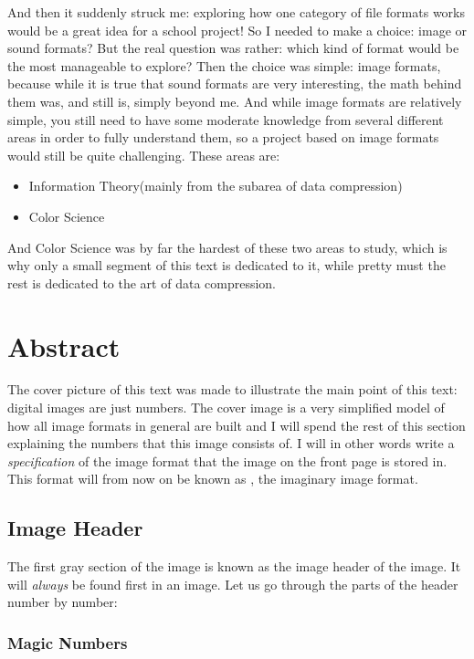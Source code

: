 And then it suddenly struck me: exploring how one category of file
formats works would be a great idea for a school project! So I needed to
make a choice: image or sound formats? But the real question was
rather: which kind of format would be the most manageable to explore?
Then the choice was simple: image formats, because while it is true
that sound formats are very interesting, the math behind them was, and
still is, simply beyond me. And while image formats are relatively
simple, you still need to have some moderate knowledge from several
different areas in order to fully understand them, so a project based
on image formats would still be quite challenging. These areas are:

\begin{itemize}
\item Information Theory(mainly from the subarea of data compression)
\item Color Science
\end{itemize}

And Color Science was by far the hardest of these two areas to study,
which is why only a small segment of this text is dedicated to it,
while pretty must the rest is dedicated to the art of data
compression.

\section{Abstract}

The cover picture of this text was made to illustrate the main point
of this text: digital images are just numbers. The cover image is a
very simplified model of how all image formats in general are built
and I will spend the rest of this section explaining the numbers that
this image consists of. I will in other words write a
\textit{specification} of the image format that the image on the front
page is stored in. This format will from now on be known as \im, the
imaginary image format.

\subsection{Image Header}

The first gray section of the image is known as the image header of
the image. It will \textit{always} be found first in an image. Let us
go through the parts of the header number by number:

\subsubsection{Magic Numbers}

